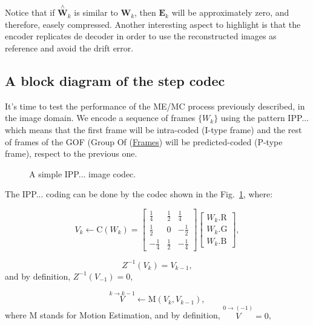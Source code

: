 Notice that if $\overset{\wedge}{{\mathbf W}}_k$ is similar to
${\mathbf W}_k$, then ${\mathbf E}_k$ will be approximately zero, and
therefore, easely compressed. Another interesting aspect to highlight
is that the encoder replicates de decoder in order to use the
reconstructed images as reference and avoid the drift error.

\subsection{A block diagram of the step codec}

It's time to test the performance of the ME/MC process previously
described, in the image domain. We encode a sequence of
frames $\{W_k\}$ using the pattern IPP... which means that the first
frame will be intra-coded (I-type frame) and the rest of frames of the
GOF (Group Of
(\href{https://en.wikipedia.org/wiki/Group_of_pictures}{Frames}) will
be predicted-coded (P-type frame), respect to the previous one.

\begin{figure}
  \centering
  \caption{A simple IPP... image codec.}
\label{fig:IPP_codec}
\end{figure}

The IPP... coding can be done by the codec shown in the
Fig.~\ref{fig:IPP_codec}, where:

\begin{equation}
  V_k \leftarrow \text{C}(W_k) =
  \begin{bmatrix}
    \frac{1}{4} &  \frac{1}{2}  &  \frac{1}{4} \\ 
    \frac{1}{2} &            0  & -\frac{1}{2} \\
    -\frac{1}{4} &  \frac{1}{2}  & -\frac{1}{4}
  \end{bmatrix}
  \begin{bmatrix}
    W_k.\text{R} \\
    W_k.\text{G} \\
    W_k.\text{B}
  \end{bmatrix}
  , \tag{a}
\end{equation}

\begin{equation}
  Z^{-1}(V_k) = V_{k-1},
  \tag{b}
\end{equation}
and by definition, $Z^{-1}(V_{-1}) = 0$,

\begin{equation}
  \overset{k\rightarrow k-1}{V} \leftarrow \text{M}(V_k, V_{k-1}),
  \tag{c}
\end{equation}
where M stands for Motion Estimation, and by definition,
$\overset{0\rightarrow (-1)}{V}=0$,

